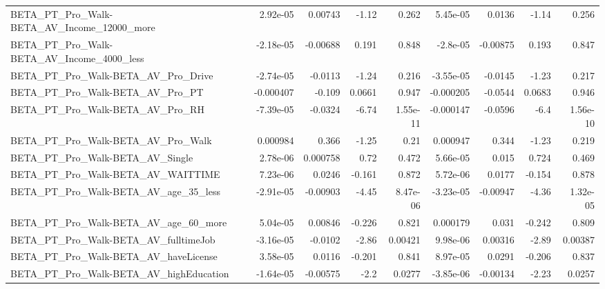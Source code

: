 \begin{tabular}{lrrrrrrrr}
BETA\_PT\_Pro\_Walk-BETA\_AV\_Income\_12000\_more         &    2.92e-05 &      0.00743 &     -1.12 &    0.262 &   5.45e-05 &      0.0136 &        -1.14 &         0.256 \\
BETA\_PT\_Pro\_Walk-BETA\_AV\_Income\_4000\_less          &   -2.18e-05 &     -0.00688 &     0.191 &    0.848 &   -2.8e-05 &    -0.00875 &        0.193 &         0.847 \\
BETA\_PT\_Pro\_Walk-BETA\_AV\_Pro\_Drive                 &   -2.74e-05 &      -0.0113 &     -1.24 &    0.216 &  -3.55e-05 &     -0.0145 &        -1.23 &         0.217 \\
BETA\_PT\_Pro\_Walk-BETA\_AV\_Pro\_PT                    &   -0.000407 &       -0.109 &    0.0661 &    0.947 &  -0.000205 &     -0.0544 &       0.0683 &         0.946 \\
BETA\_PT\_Pro\_Walk-BETA\_AV\_Pro\_RH                    &   -7.39e-05 &      -0.0324 &     -6.74 & 1.55e-11 &  -0.000147 &     -0.0596 &         -6.4 &      1.56e-10 \\
BETA\_PT\_Pro\_Walk-BETA\_AV\_Pro\_Walk                  &    0.000984 &        0.366 &     -1.25 &     0.21 &   0.000947 &       0.344 &        -1.23 &         0.219 \\
BETA\_PT\_Pro\_Walk-BETA\_AV\_Single                    &    2.78e-06 &     0.000758 &      0.72 &    0.472 &   5.66e-05 &       0.015 &        0.724 &         0.469 \\
BETA\_PT\_Pro\_Walk-BETA\_AV\_WAITTIME                  &    7.23e-06 &       0.0246 &    -0.161 &    0.872 &   5.72e-06 &      0.0177 &       -0.154 &         0.878 \\
BETA\_PT\_Pro\_Walk-BETA\_AV\_age\_35\_less               &   -2.91e-05 &     -0.00903 &     -4.45 & 8.47e-06 &  -3.23e-05 &    -0.00947 &        -4.36 &      1.32e-05 \\
BETA\_PT\_Pro\_Walk-BETA\_AV\_age\_60\_more               &    5.04e-05 &      0.00846 &    -0.226 &    0.821 &   0.000179 &       0.031 &       -0.242 &         0.809 \\
BETA\_PT\_Pro\_Walk-BETA\_AV\_fulltimeJob               &   -3.16e-05 &      -0.0102 &     -2.86 &  0.00421 &   9.98e-06 &     0.00316 &        -2.89 &       0.00387 \\
BETA\_PT\_Pro\_Walk-BETA\_AV\_haveLicense               &    3.58e-05 &       0.0116 &    -0.201 &    0.841 &   8.97e-05 &      0.0291 &       -0.206 &         0.837 \\
BETA\_PT\_Pro\_Walk-BETA\_AV\_highEducation             &   -1.64e-05 &     -0.00575 &      -2.2 &   0.0277 &  -3.85e-06 &    -0.00134 &        -2.23 &        0.0257 \\

\end{tabular}
